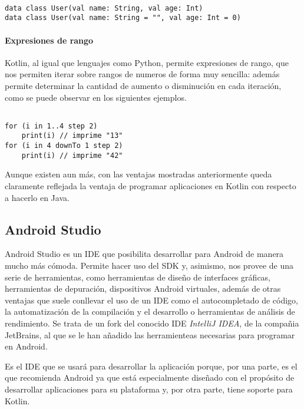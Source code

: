 \begin{verbatim}

data class User(val name: String, val age: Int)
data class User(val name: String = "", val age: Int = 0)

\end{verbatim}

\paragraph{Expresiones de rango}

Kotlin, al igual que lenguajes como Python, permite expresiones de rango, que nos permiten iterar sobre rangos de numeros de forma muy sencilla: además permite determinar la cantidad de aumento o disminución en cada iteración, como se puede observar en los siguientes ejemplos.

\begin{verbatim}

for (i in 1..4 step 2) 
	print(i) // imprime "13"
for (i in 4 downTo 1 step 2)
	print(i) // imprime "42"

\end{verbatim}

Aunque existen aun más, con las ventajas mostradas anteriormente queda claramente reflejada la ventaja de programar aplicaciones en Kotlin con respecto a hacerlo en Java.

\subsection{Android Studio}

Android Studio es un IDE que posibilita desarrollar para Android de manera mucho más cómoda. Permite hacer uso del SDK y, asimismo, nos provee de una serie de herramientas, como herramientas de diseño de interfaces gráficas, herramientas de depuración, dispositivos Android virtuales, además de otras ventajas que suele conllevar el uso de un IDE como el autocompletado de código, la automatización de la compilación y el desarrollo o herramientas de análisis de rendimiento. Se trata de un fork del conocido IDE \textit{IntelliJ IDEA}, de la compañia JetBrains, al que se le han añadido las herramienteas necesarias para programar en Android.

Es el IDE que se usará para desarrollar la aplicación porque, por una parte, es el que recomienda Android ya que está especialmente diseñado con el propósito de desarrollar aplicaciones para su plataforma y, por otra parte, tiene soporte para Kotlin.

